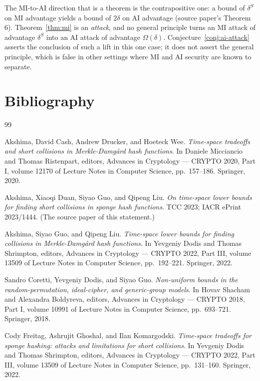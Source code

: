 \documentclass{aicr-conjecture}
\begin{document}
\begin{remark}\label{rem:lift}
The MI-to-AI direction that is a theorem is the contrapositive one:
a bound of $\delta^{S}$ on MI advantage yields a bound of $2\delta$ on
AI advantage (source paper's Theorem 6). Theorem~\ref{thm:mi} is an
\emph{attack}, and no general principle turns an MI attack of
advantage $\delta^{S}$ into an AI attack of advantage $\Omega(\delta)$.
Conjecture~\ref{conj:ai-attack} asserts the conclusion of such a lift
in this one case; it does not assert the general principle, which is
false in other settings where MI and AI security are known to
separate.
\end{remark}

\section{Bibliography}

\begin{aicrbibliography}{99}

Akshima, David Cash, Andrew Drucker, and Hoeteck Wee.
\emph{Time-space tradeoffs and short collisions in Merkle-Damg\aa{}rd
hash functions}.
In Daniele Micciancio and Thomas Ristenpart, editors, Advances in
Cryptology --- CRYPTO 2020, Part I, volume 12170 of Lecture Notes in
Computer Science, pp.\ 157--186. Springer, 2020.

Akshima, Xiaoqi Duan, Siyao Guo, and Qipeng Liu.
\emph{On time-space lower bounds for finding short collisions in sponge
hash functions}.
TCC 2023; IACR ePrint 2023/1444. (The source paper of this statement.)

Akshima, Siyao Guo, and Qipeng Liu.
\emph{Time-space lower bounds for finding collisions in
Merkle-Damg\aa{}rd hash functions}.
In Yevgeniy Dodis and Thomas Shrimpton, editors, Advances in Cryptology
--- CRYPTO 2022, Part III, volume 13509 of Lecture Notes in Computer
Science, pp.\ 192--221. Springer, 2022.

Sandro Coretti, Yevgeniy Dodis, and Siyao Guo.
\emph{Non-uniform bounds in the random-permutation, ideal-cipher, and
generic-group models}.
In Hovav Shacham and Alexandra Boldyreva, editors, Advances in
Cryptology --- CRYPTO 2018, Part I, volume 10991 of Lecture Notes in
Computer Science, pp.\ 693--721. Springer, 2018.

Cody Freitag, Ashrujit Ghoshal, and Ilan Komargodski.
\emph{Time-space tradeoffs for sponge hashing: attacks and limitations
for short collisions}.
In Yevgeniy Dodis and Thomas Shrimpton, editors, Advances in Cryptology
--- CRYPTO 2022, Part III, volume 13509 of Lecture Notes in Computer
Science, pp.\ 131--160. Springer, 2022.

\end{aicrbibliography}
\end{document}

